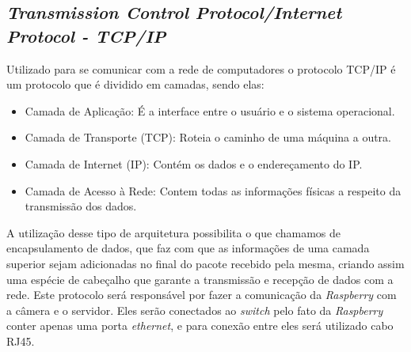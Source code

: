 \subsection{ \emph{Transmission Control Protocol/Internet Protocol - TCP/IP}}
Utilizado para se comunicar com a rede de computadores o protocolo TCP/IP é um protocolo que é dividido em camadas, sendo elas:
\begin{itemize}
    \item Camada de Aplicação: É a interface entre o usuário e o sistema operacional.
    \item Camada de Transporte (TCP): Roteia o caminho de uma máquina a outra.
    \item Camada de Internet (IP): Contém os dados e o endereçamento do IP.
    \item Camada de Acesso à Rede: Contem todas as informações físicas a respeito da transmissão dos dados.
    
\end{itemize}

A utilização desse tipo de arquitetura possibilita o que chamamos de encapsulamento de dados, que faz com que as informações de uma camada superior sejam adicionadas no final do pacote recebido pela mesma, criando assim uma espécie de cabeçalho que garante a transmissão e recepção de dados com a rede.
Este protocolo será responsável por fazer a comunicação da \emph{Raspberry} com a câmera e o servidor. Eles serão conectados ao \emph{switch} pelo fato da \emph{Raspberry} conter apenas uma porta \emph{ethernet}, e para conexão entre eles será utilizado cabo RJ45.

